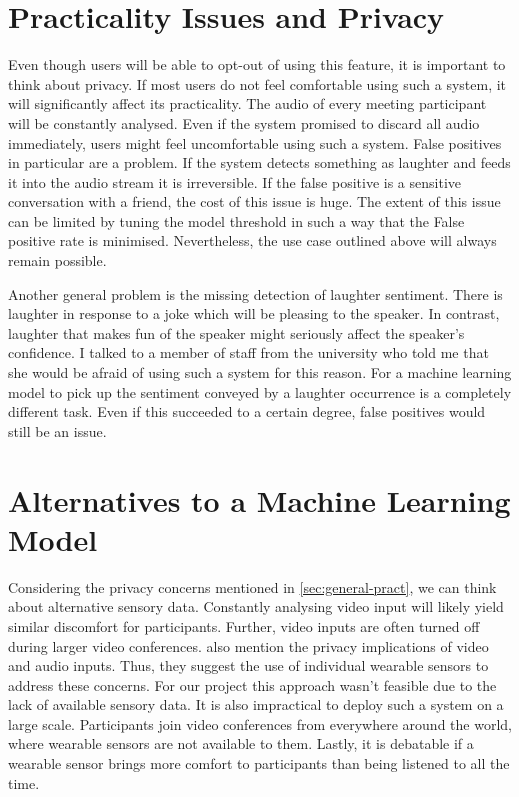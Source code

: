 \documentclass[bsc,frontabs,parskip,deptreport]{infthesis}
\begin{document}
\section{Practicality Issues and Privacy} \label{sec:general-pract}
Even though users will be able to opt-out of using this feature, it is important to think about privacy. If most users do not feel comfortable using such a system, it will significantly affect its practicality.  
The audio of every meeting participant will be constantly analysed. Even if the system promised to discard all audio immediately, users might feel uncomfortable using such a system. False positives in particular are a problem. If the system detects something as laughter and feeds it into the audio stream it is irreversible. If the false positive is a sensitive conversation with a friend, the cost of this issue is huge. 
The extent of this issue can be limited by tuning the model threshold in such a way that the False positive rate is minimised. Nevertheless, the use case outlined above will always remain possible. 

Another general problem is the missing detection of laughter sentiment. There is laughter in response to a joke which will be pleasing to the speaker. In contrast, laughter that makes fun of the speaker might seriously affect the speaker's confidence. I talked to a member of staff from the university who told me that she would be afraid of using such a system for this reason. 
For a machine learning model to pick up the sentiment conveyed by a laughter occurrence is a completely different task. Even if this succeeded to a certain degree, false positives would still be an issue.


\section{Alternatives to a Machine Learning Model}
Considering the privacy concerns mentioned in \autoref{sec:general-pract}, we can think about alternative sensory data. 
Constantly analysing video input will likely yield similar discomfort for participants. Further, video inputs are often turned off during larger video conferences.
\citet{cosentino2016quantitative}  also mention the privacy implications of video and audio inputs.
Thus, they suggest the use of individual wearable sensors to address these concerns. For our project this approach wasn't feasible due to the lack of available sensory data.
It is also impractical to deploy such a system on a large scale. Participants join video conferences from everywhere around the world, where wearable sensors are not available to them. Lastly, it is debatable if a wearable sensor brings more comfort to participants than being listened to all the time. 
\end{document}
